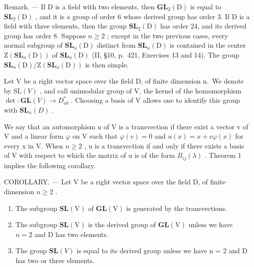 Remark. --- If D is a field with two elements, then \(\mathbf{GL}_{2}(\mathrm{D})\) is equal to \(\mathbf{SL}_{2}(\mathrm{D})\) , and it is a group of order 6 whose derived group has order 3. If D is a field with three elements, then the group \(\mathbf{SL}_{2}(\mathrm{D})\) has order 24, and its derived group has order 8. Suppose \(n \geqslant 2\) ; except in the two previous cases, every normal subgroup of \(\mathbf{SL}_{n}(\mathrm{D})\) distinct from \(\mathbf{SL}_{n}(\mathrm{D})\) is contained in the center \(\mathrm{Z}(\mathbf{SL}_{n}(\mathrm{D}))\) of \(\mathbf{SL}_{n}(\mathrm{D})\) (II, §10, p.~421, Exercises 13 and 14). The group \(\mathbf{SL}_{n}(\mathrm{D})/\mathrm{Z}(\mathbf{SL}_{n}(\mathrm{D}))\) is then simple.

Let V be a right vector space over the field D, of finite dimension n.~We denote by \(\mathrm{SL}(V)\) , and call unimodular group of V, the kernel of the homomorphism \(\det: \mathbf{GL}(V) \to D_{ab}^{*}\) . Choosing a basis of V allows one to identify this group with \(\mathbf{SL}_{n}(D)\) .

We say that an automorphism u of V is a transvection if there exist a vector v of V and a linear form \(\varphi\) on V such that \(\varphi(v)=0\) and \(u(x)=x+v\varphi(x)\) for every x in V. When \(n\geqslant2\) , u is a transvection if and only if there exists a basis of V with respect to which the matrix of u is of the form \(B_{ij}(\lambda)\) . Theorem 1 implies the following corollary.

COROLLARY. --- Let V be a right vector space over the field D, of finite dimension \(n \geqslant 2\) .

\begin{enumerate}
\def\labelenumi{\alph{enumi})}
\item
  The subgroup \(\mathbf{SL}(\mathrm{V})\) of \(\mathbf{GL}(\mathrm{V})\) is generated by the transvections.
\item
  The subgroup \(\mathbf{SL}(\mathrm{V})\) is the derived group of \(\mathbf{GL}(\mathrm{V})\) unless we have \(n = 2\) and D has two elements.
\item
  The group \(\mathbf{SL}(V)\) is equal to its derived group unless we have n = 2 and D has two or three elements.
\end{enumerate}

